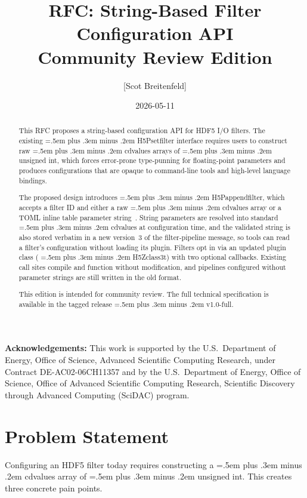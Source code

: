 \documentclass[letterpaper,hyper]{HDF5_RFC}
\title{RFC: String-Based Filter Configuration API\\[4pt]
       {\large Community Review Edition}}
\author{[Scot Breitenfeld]}
\date{2026-05-11}
\renewcommand{\texttt}[1]{\begingroup\small\ttfamily\hyphenchar\font=45
  \spaceskip=.5em plus .3em minus .2em #1\endgroup}
\renewcommand{\_}{\oldtextunderscore\allowbreak}
\begin{document}
\maketitle

\begin{abstract}
This RFC proposes a string-based configuration API for HDF5 I/O filters.
The existing \texttt{H5Pset\_filter} interface requires users to construct raw
\texttt{cd\_values} arrays of \texttt{unsigned int}, which forces error-prone
type-punning for floating-point parameters and produces configurations that are
opaque to command-line tools and high-level language bindings.

The proposed design introduces \texttt{H5Pappend\_filter}, which accepts a
filter ID and either a raw \texttt{cd\_values} array or a TOML inline table
parameter string~\cite{toml10}. String parameters are resolved into standard
\texttt{cd\_values} at configuration time, and the validated string is also
stored verbatim in a new version~3 of the filter-pipeline message, so tools
can read a filter's configuration without loading its plugin. Filters opt in
via an updated plugin class (\texttt{H5Z\_class3\_t}) with two optional
callbacks. Existing call sites compile and function without modification, and
pipelines configured without parameter strings are still written in the old
format.

This edition is intended for community review. The full technical specification
is available in the tagged release \texttt{v1.0-full}.
\end{abstract}

\vfill
{\footnotesize\textbf{Acknowledgements:} This work is supported by the U.S.\
Department of Energy, Office of Science, Advanced Scientific Computing Research,
under Contract DE-AC02-06CH11357 and by the U.S.\ Department of Energy, Office
of Science, Office of Advanced Scientific Computing Research, Scientific
Discovery through Advanced Computing (SciDAC) program.}

\makerevisions
\tableofcontents

\section{Problem Statement}

Configuring an HDF5 filter today requires constructing a \texttt{cd\_values}
array of \texttt{unsigned int}. This creates three concrete pain points.
\end{document}

